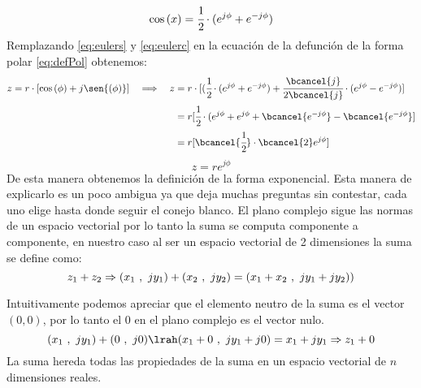 \begin{equation}\label{eq:eulerc}
    \cos{(x)}=\cfrac{1}{2}\cdot(e^{j\phi}+e^{-j\phi})
\end{equation}
Remplazando \ref{eq:eulers} y \ref{eq:eulerc} en la ecuación de la defunción de la forma polar \ref{eq:defPol} obtenemos:
\begin{equation}
\begin{aligned}
      z=r\cdot[\cos{(\phi)}+j\sen{(\phi)}] \quad\Longrightarrow\quad z&=r\cdot[(\cfrac{1}{2}\cdot(e^{j\phi}+e^{-j\phi})+\cfrac{\bcancel{j}}{2\bcancel{j}}\cdot(e^{j\phi}-e^{-j\phi})]\\
      &=r[\cfrac{1}{2}\cdot(e^{j\phi}+e^{j\phi}+\bcancel{e^{-j\phi}}-\bcancel{e^{-j\phi}}]\\
      &=r[\bcancel{\cfrac{1}{2}}\cdot \bcancel{2}e^{j\phi}]\\
\end{aligned}
\end{equation}
\begin{equation}\label{eq:defExp}
    z=re^{j\phi}
\end{equation}
De esta manera obtenemos la definición de la forma exponencial. Esta manera de explicarlo es un poco ambigua ya que deja muchas preguntas sin contestar, cada uno elige hasta donde seguir el conejo blanco.
    El plano complejo sigue las normas de un espacio vectorial por lo tanto la suma se computa componente a componente, en nuestro caso al ser un espacio vectorial de 2 dimensiones la suma se define como:
        \begin{equation}\label{eq:sum}
          z_1+z_2 \Rightarrow (x_1\ ,\ jy_1)+(x_2\ ,\ jy_2)=(x_1+x_2\ ,\ jy_1+jy_2))\\
        \end{equation}
    \begin{figure}[H]
        \centering
        
        \label{fig:sumaC}
    \end{figure}
    Intuitivamente podemos apreciar que el elemento neutro de la suma es el vector $(0,0)$, por lo tanto el 0 en el plano complejo es el vector nulo.
        \begin{equation}\label{eq:sumnul}
            (x_1\ ,\ jy_1)+(0\ ,\ j0) \lrah (x_1+0\ ,\ jy_1+j0)=x_1+jy_1 \Rightarrow z_1+0 \\
        \end{equation}
    La suma hereda todas las propiedades de la suma en un espacio vectorial de $n$ dimensiones reales.
